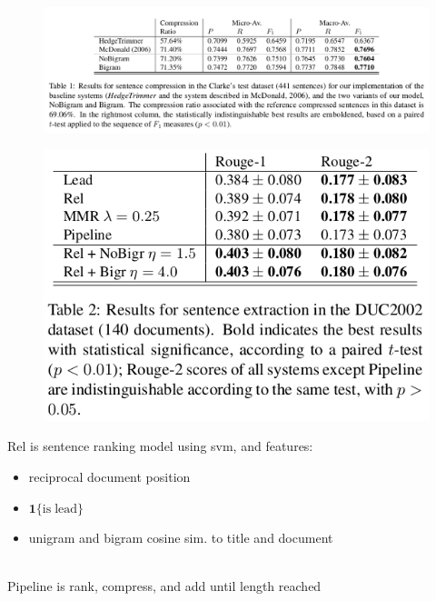 \documentclass[xcolor={table}]{beamer}
\begin{document}
\begin{frame}[t]{\cite{martins2009summarization}}
      \begin{figure}[h]
          \centering
      \includegraphics[scale=.25]{images/table1-martins09.png} \\
  \end{figure}
\end{frame}

\begin{frame}[t]{\cite{martins2009summarization}}
      \begin{figure}[h]
          \centering
      \includegraphics[scale=.25]{images/table2-martins09.png} \\
  \end{figure}

Rel is sentence ranking model using svm, and features:
\begin{itemize}
    \item reciprocal document position
    \item $\mathbf{1}\{\mathrm{is\;lead}\}$
    \item unigram and bigram cosine sim. to title and document
\end{itemize}
~\\
Pipeline is rank, compress, and add until length reached

\end{frame}
\end{document}
